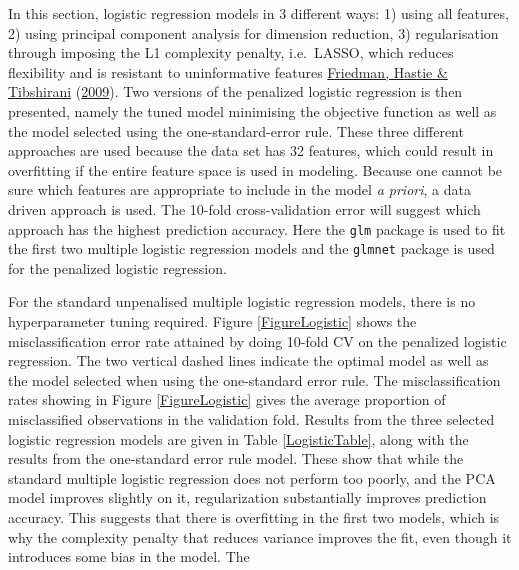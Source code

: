 \documentclass[11pt,preprint, authoryear]{elsarticle}
\numberwithin{equation}{section}
\numberwithin{figure}{section}
\numberwithin{table}{section}
\begin{document}
In this section, logistic regression models in 3 different ways: 1)
using all features, 2) using principal component analysis for dimension
reduction, 3) regularisation through imposing the L1 complexity penalty,
i.e.~LASSO, which reduces flexibility and is resistant to uninformative
features \protect\hyperlink{ref-ESL}{Friedman, Hastie \& Tibshirani}
(\protect\hyperlink{ref-ESL}{2009}). Two versions of the penalized
logistic regression is then presented, namely the tuned model minimising
the objective function as well as the model selected using the
one-standard-error rule. These three different approaches are used
because the data set has 32 features, which could result in overfitting
if the entire feature space is used in modeling. Because one cannot be
sure which features are appropriate to include in the model \emph{a
priori}, a data driven approach is used. The 10-fold cross-validation
error will suggest which approach has the highest prediction accuracy.
Here the \texttt{glm} package is used to fit the first two multiple
logistic regression models and the \texttt{glmnet} package is used for
the penalized logistic regression.

For the standard unpenalised multiple logistic regression models, there
is no hyperparameter tuning required. Figure \ref{FigureLogistic} shows
the misclassification error rate attained by doing 10-fold CV on the
penalized logistic regression. The two vertical dashed lines indicate
the optimal model as well as the model selected when using the
one-standard error rule. The misclassification rates showing in Figure
\ref{FigureLogistic} gives the average proportion of misclassified
observations in the validation fold. Results from the three selected
logistic regression models are given in Table \ref{LogisticTable}, along
with the results from the one-standard error rule model. These show that
while the standard multiple logistic regression does not perform too
poorly, and the PCA model improves slightly on it, regularization
substantially improves prediction accuracy. This suggests that there is
overfitting in the first two models, which is why the complexity penalty
that reduces variance improves the fit, even though it introduces some
bias in the model. The
\end{document}
